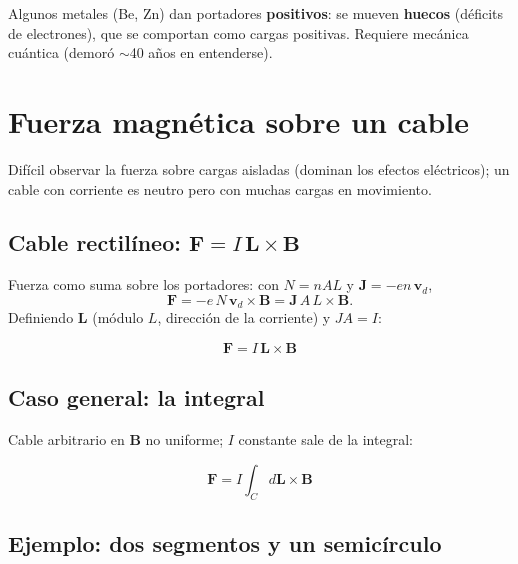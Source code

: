 \documentclass[12pt,a4paper]{article}
\begin{document}
\begin{warnbox}[Huecos]
  Algunos metales (Be, Zn) dan portadores \textbf{positivos}: se mueven
  \textbf{huecos} (déficits de electrones), que se comportan como cargas
  positivas. Requiere mecánica cuántica (demoró $\sim$40 años en
  entenderse).
\end{warnbox}



\section{Fuerza magnética sobre un cable}

Difícil observar la fuerza sobre cargas aisladas (dominan los efectos
eléctricos); un cable con corriente es neutro pero con muchas cargas en
movimiento.

\subsection{Cable rectilíneo: $\mathbf{F} = I\,\mathbf{L}\times\mathbf{B}$}

Fuerza como suma sobre los portadores: con $N = nAL$ y
$\mathbf{J} = -en\,\mathbf{v}_d$,
\[
\mathbf{F} = -e\,N\,\mathbf{v}_d\times\mathbf{B}
           = \mathbf{J}\,A\,L\times\mathbf{B}.
\]
Definiendo $\mathbf{L}$ (módulo $L$, dirección de la corriente) y
$JA = I$:

\begin{keybox}
  \[
  \boxed{\mathbf{F} = I\,\mathbf{L}\times\mathbf{B}}
  \]
\end{keybox}



\subsection{Caso general: la integral}

Cable arbitrario en $\mathbf{B}$ no uniforme; $I$ constante sale de la
integral:

\begin{keybox}
  \[
  \boxed{\mathbf{F} = I\int_C d\mathbf{L}\times\mathbf{B}}
  \]
\end{keybox}

\subsection{Ejemplo: dos segmentos y un semicírculo}
\end{document}

